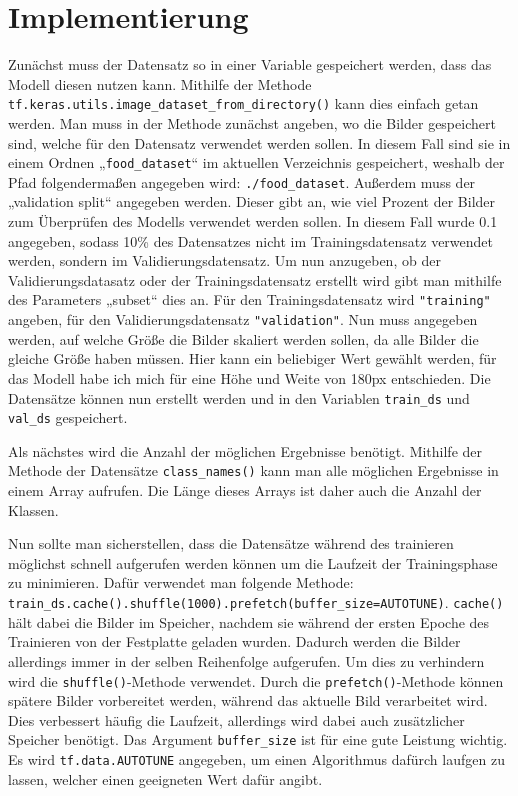 \documentclass[11pt,oneside]{report}
\begin{document}
\section{Implementierung}
Zunächst muss der Datensatz so in einer Variable gespeichert werden, dass das Modell diesen nutzen kann. Mithilfe der Methode \verb+tf.keras.utils.image_dataset_from_directory()+ kann dies einfach getan werden. Man muss in der Methode zunächst angeben, wo die Bilder gespeichert sind, welche für den Datensatz verwendet werden sollen. In diesem Fall sind sie in einem Ordnen „\verb+food_dataset+“ im aktuellen Verzeichnis gespeichert, weshalb der Pfad folgendermaßen angegeben wird: \verb+./food_dataset+. Außerdem muss der „validation split“ angegeben werden. Dieser gibt an, wie viel Prozent der Bilder zum Überprüfen des Modells verwendet werden sollen. In diesem Fall wurde 0.1 angegeben, sodass 10\% des Datensatzes nicht im Trainingsdatensatz verwendet werden, sondern im Validierungsdatensatz. Um nun anzugeben, ob der Validierungsdatasatz oder der Trainingsdatensatz erstellt wird gibt man mithilfe des Parameters „subset“ dies an. Für den Trainingsdatensatz wird \verb+"training"+ angeben, für den Validierungsdatensatz \verb+"validation"+. Nun muss angegeben werden, auf welche Größe die Bilder skaliert werden sollen, da alle Bilder die gleiche Größe haben müssen. Hier kann ein beliebiger Wert gewählt werden, für das Modell habe ich mich für eine Höhe und Weite von 180px entschieden. Die Datensätze können nun erstellt werden und in den Variablen \verb+train_ds+ und \verb+val_ds+ gespeichert.

Als nächstes wird die Anzahl der möglichen Ergebnisse benötigt. Mithilfe der Methode der Datensätze \verb+class_names()+ kann man alle möglichen Ergebnisse in einem Array aufrufen. Die Länge dieses Arrays ist daher auch die Anzahl der Klassen.

Nun sollte man sicherstellen, dass die Datensätze während des trainieren möglichst schnell aufgerufen werden können um die Laufzeit der Trainingsphase zu minimieren. Dafür verwendet man folgende Methode: \verb+train_ds.cache().shuffle(1000).prefetch(buffer_size=AUTOTUNE)+. \verb+cache()+ hält dabei die Bilder im Speicher, nachdem sie während der ersten Epoche des Trainieren von der Festplatte geladen wurden. Dadurch werden die Bilder allerdings immer in der selben Reihenfolge aufgerufen. Um dies zu verhindern wird die \verb+shuffle()+-Methode verwendet. Durch die \verb+prefetch()+-Methode können spätere Bilder vorbereitet werden, während das aktuelle Bild verarbeitet wird. Dies verbessert häufig die Laufzeit, allerdings wird dabei auch zusätzlicher Speicher benötigt. Das Argument \verb+buffer_size+ ist für eine gute Leistung wichtig. Es wird \verb+tf.data.AUTOTUNE+ angegeben, um einen Algorithmus dafürch laufgen zu lassen, welcher einen geeigneten Wert dafür angibt.
\end{document}

